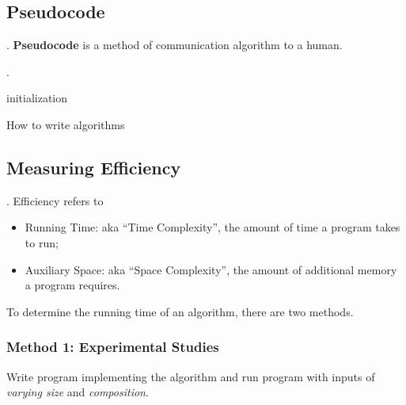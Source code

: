 \documentclass{article}
\begin{document}
\subsection{Pseudocode}

\begin{deff}.
    \textbf{Pseudocode} is a method of communication algorithm to a human. 
\end{deff}

\begin{exampleee}.
    
\end{exampleee}

\begin{algorithm}[H]   initialization\;  \caption{How to write algorithms} \end{algorithm}

\subsection{Measuring Efficiency} 

\begin{deff}.
    Efficiency refers to \begin{itemize}
        \item Running Time: aka  ``Time Complexity'', the amount of time a program takes to run; 
        \item Auxiliary Space: aka ``Space Complexity'', the amount of additional memory a program requires. 
    \end{itemize} 
\end{deff}

To determine the running time of an algorithm, there are two methods. 

\subsubsection{Method 1: Experimental Studies}

Write program implementing the algorithm and run program with inputs of \textit{varying size} and \textit{composition}. 
\end{document}
